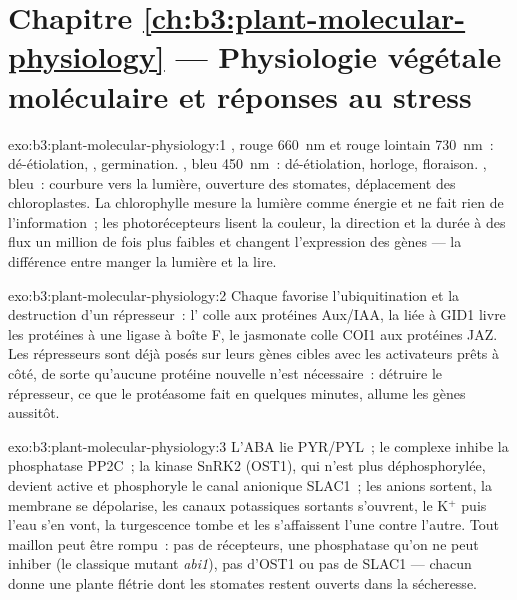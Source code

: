 \section*{Chapitre \ref{ch:b3:plant-molecular-physiology} --- Physiologie végétale moléculaire et réponses au stress}

\begin{solution}{exo:b3:plant-molecular-physiology:1}
, rouge \qty{660}{nm} et rouge lointain \qty{730}{nm}~:
dé-étiolation, , germination. , bleu
\qty{450}{nm}~: dé-étiolation, horloge, floraison. , bleu~:
courbure vers la lumière, ouverture des stomates, déplacement des
chloroplastes. La chlorophylle mesure la lumière comme énergie et ne
fait rien de l'information~; les photorécepteurs lisent la couleur, la
direction et la durée à des flux un million de fois plus faibles et
changent l'expression des gènes --- la différence entre manger la
lumière et la lire.
\end{solution}

\begin{solution}{exo:b3:plant-molecular-physiology:2}
Chaque  favorise l'ubiquitination et la destruction d'un
répresseur~: l' colle  aux protéines Aux/IAA, la 
liée à GID1 livre les protéines  à une ligase à boîte F, le
jasmonate colle COI1 aux protéines JAZ. Les répresseurs sont déjà posés
sur leurs gènes cibles avec les activateurs prêts à côté, de sorte
qu'aucune protéine nouvelle n'est nécessaire~: détruire le répresseur,
ce que le protéasome fait en quelques minutes, allume les gènes
aussitôt.
\end{solution}

\begin{solution}{exo:b3:plant-molecular-physiology:3}
L'ABA lie PYR/PYL~; le complexe inhibe la phosphatase PP2C~; la kinase
SnRK2 (OST1), qui n'est plus déphosphorylée, devient active et
phosphoryle le canal anionique SLAC1~; les anions sortent, la membrane
se dépolarise, les canaux potassiques sortants s'ouvrent, le K$^{+}$
puis l'eau s'en vont, la turgescence tombe et les 
s'affaissent l'une contre l'autre. Tout maillon peut être rompu~: pas de
récepteurs, une phosphatase qu'on ne peut inhiber (le classique mutant
\emph{abi1}), pas d'OST1 ou pas de SLAC1 --- chacun donne une plante
flétrie dont les stomates restent ouverts dans la sécheresse.
\end{solution}

